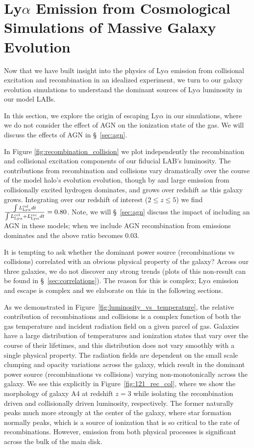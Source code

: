 \section{Ly\texorpdfstring{$\alpha$}{a} Emission from Cosmological Simulations of Massive Galaxy Evolution}
\label{sec:evolution}

Now that we have built insight into the physics of Ly$\alpha$ emission from collisional excitation and recombination in an idealized experiment, we turn to our galaxy evolution simulations to understand the dominant sources of Ly$\alpha$ luminosity in our model LABs.

In this section, we explore the origin of escaping Ly$\alpha$ in our simulations, where we do not consider the effect of AGN on the ionization state of the gas.
We will discuss the effects of AGN in \S~\ref{sec:agn}.

In Figure \ref{fig:recombination_collision} we plot independently the recombination and collisional excitation components of our fiducial LAB's luminosity.
The contributions from recombination and collisions vary dramatically over the course of the model halo's evolution evolution, though by and large emission from collisionally excited hydrogen dominates, and grows over redshift as this galaxy grows.
Integrating over our redshift of interest ($2 \leq z \leq 5$) we find $\frac{\int L_{\rm Ly \alpha}^{\rm col} dt}{\int L_{\rm Ly \alpha}^{\rm col} + L_{\rm Ly \alpha}^{\rm rec} dt} = 0.80$.
Note, we will \S~\ref{sec:agn} discuss the impact of including an AGN in these models; when we include AGN recombination from emissions dominates and the above ratio becomes $0.03$.

It is tempting to ask whether the dominant power source (recombinations vs collisions) correlated with an obvious physical property of the galaxy?
Across our three galaxies, we do not discover any strong trends (plots of this non-result can be found in \S~\ref{sec:correlations}).
The reason for this is complex; Ly$\alpha$ emission and escape is complex and we elaborate on this in the following sections.

As we demonstrated in Figure~\ref{fig:luminosity_vs_temperature}, the relative contribution of recombinations and collisions is a complex function of both the gas temperature and incident radiation field on a given parcel of gas.
Galaxies have a large distribution of temperatures and ionization states that vary over the course of their lifetimes, and this distribution does not vary smoothly with a single physical property.
The radiation fields are dependent on the small scale clumping and opacity variations across the galaxy, which result in the dominant power source (recombinations vs collisions) varying non-monotonically across the galaxy.
We see this explicitly in Figure~\ref{fig:121_rec_col}, where we show the morphology of galaxy A4 at redshift $z=3$ while isolating the recombination driven and collisionally driven luminosity, respectively.
The former naturally peaks much more strongly at the center of the galaxy, where star formation normally peaks, which is a source of ionization that is so critical to the rate of recombinations.
However, emission from both physical processes is significant across the bulk of the main disk.

